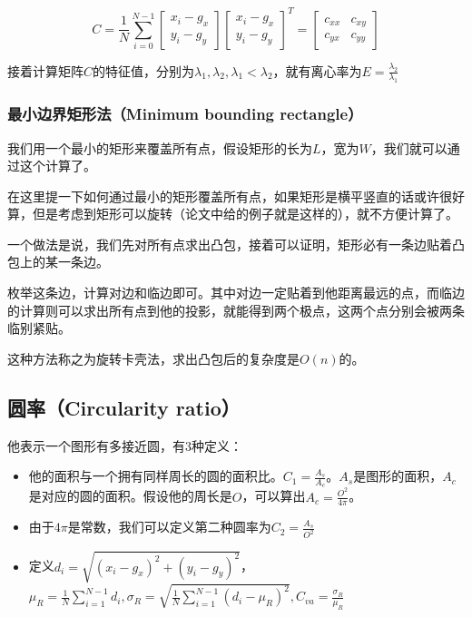 \documentclass{ctexart}
\begin{document}
\[C=\frac{1}{N}\sum_{i=0}^{N-1}\begin{bmatrix}x_i-g_x \\ y_i-g_y\end{bmatrix}\begin{bmatrix}x_i-g_x \\ y_i-g_y\end{bmatrix}^T=\begin{bmatrix}c_{xx} & c_{xy} \\ c_{yx} & c_{yy}\end{bmatrix}\]

接着计算矩阵$C$的特征值，分别为$\lambda_1,\lambda_2,\lambda_1<\lambda_2$，就有离心率为$E=\frac{\lambda_2}{\lambda_1}$
\subsubsection{最小边界矩形法（Minimum bounding rectangle）}

我们用一个最小的矩形来覆盖所有点，假设矩形的长为$L$，宽为$W$，我们就可以通过这个计算了。

在这里提一下如何通过最小的矩形覆盖所有点，如果矩形是横平竖直的话或许很好算，但是考虑到矩形可以旋转（论文中给的例子就是这样的），就不方便计算了。

一个做法是说，我们先对所有点求出凸包，接着可以证明，矩形必有一条边贴着凸包上的某一条边。

枚举这条边，计算对边和临边即可。其中对边一定贴着到他距离最远的点，而临边的计算则可以求出所有点到他的投影，就能得到两个极点，这两个点分别会被两条临别紧贴。

这种方法称之为旋转卡壳法，求出凸包后的复杂度是$O(n)$的。

\subsection{圆率（Circularity ratio）}
他表示一个图形有多接近圆，有$3$种定义：
\begin{itemize}
\item 他的面积与一个拥有同样周长的圆的面积比。$C_1=\frac{A_s}{A_c}$。$A_s$是图形的面积，$A_c$是对应的圆的面积。假设他的周长是$O$，可以算出$A_c=\frac{O^2}{4\pi}$。
\item 由于$4\pi$是常数，我们可以定义第二种圆率为$C_2=\frac{A_s}{O^2}$
\item 定义$d_i=\sqrt{(x_i-g_x)^2+(y_i-g_y)^2}$，$\mu_R=\frac{1}{N}\sum_{i=1}^{N-1}d_i,\sigma_R=\sqrt{\frac{1}{N}\sum_{i=1}^{N-1}(d_i-\mu_R)^2},C_{va}=\frac{\sigma_R}{\mu_R}$
\end{itemize}
\end{document}
